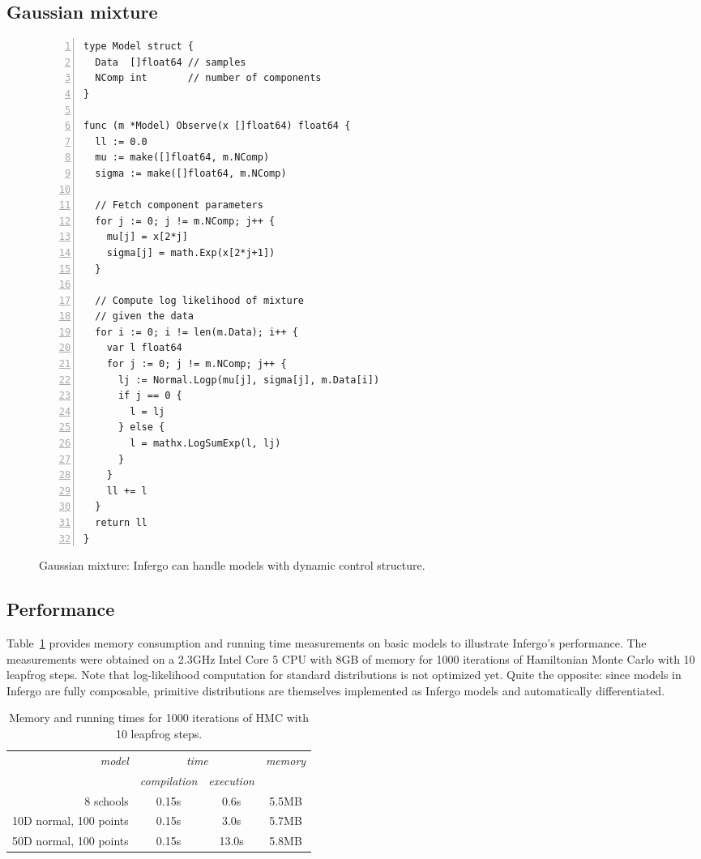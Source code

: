 \documentclass[sigplan,review,10pt,anonymous]{acmart}
\begin{document}
\begin{sloppypar}
\subsection{Gaussian mixture}

\begin{figure}
\begin{lstlisting}[numbers=left]
type Model struct {
  Data  []float64 // samples
  NComp int       // number of components
}

func (m *Model) Observe(x []float64) float64 {
  ll := 0.0
  mu := make([]float64, m.NComp)
  sigma := make([]float64, m.NComp)

  // Fetch component parameters
  for j := 0; j != m.NComp; j++ {
    mu[j] = x[2*j]
    sigma[j] = math.Exp(x[2*j+1])
  }

  // Compute log likelihood of mixture
  // given the data
  for i := 0; i != len(m.Data); i++ {
    var l float64
    for j := 0; j != m.NComp; j++ {
      lj := Normal.Logp(mu[j], sigma[j], m.Data[i])
      if j == 0 {
        l = lj
      } else {
        l = mathx.LogSumExp(l, lj)
      }
    }
    ll += l
  }
  return ll
}
\end{lstlisting}
\caption{Gaussian mixture: Infergo can handle models with
	dynamic control structure.}
\label{fig:gaussian-mixture}
\end{figure}


\subsection{Performance}

Table~\ref{tab:memory-runtime} provides memory consumption and
running time measurements on basic models to illustrate
Infergo's performance.  The measurements were obtained on a
2.3GHz Intel Core 5 CPU with 8GB of memory for 1000 iterations
of Hamiltonian Monte Carlo with 10 leapfrog steps. Note that
log-likelihood computation for standard distributions is not
optimized yet. Quite the opposite: since models in Infergo are
fully composable, primitive distributions are themselves
implemented as Infergo models and automatically differentiated.

{\smaller
\begin{table}[H]
\caption{Memory and running times for 1000 iterations
of HMC with 10 leapfrog steps.}
\label{tab:memory-runtime}
\begin{tabular}{r | c |  c | c}
	{\it model}  & \multicolumn{2}{c|}{\it time} & {\it memory} \\ 
	 & {\it compilation} & {\it execution} & \\\hline
	8 schools & 0.15s & 0.6s & 5.5MB \\
	10D normal, 100 points & 0.15s & 3.0s & 5.7MB \\
	50D normal, 100 points & 0.15s & 13.0s & 5.8MB 
\end{tabular}
\end{table}}


\end{sloppypar}
\end{document}
